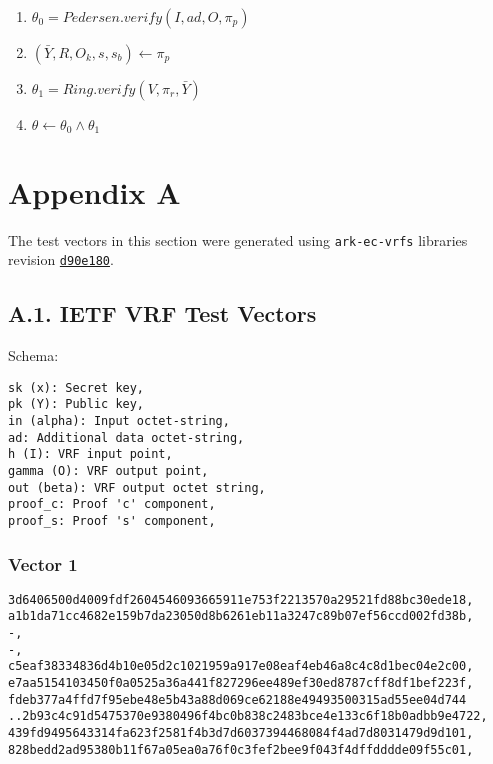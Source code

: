 \documentclass[
]{article}
\providecommand{\tightlist}{%
  \setlength{\itemsep}{0pt}\setlength{\parskip}{0pt}}
\begin{document}
\begin{enumerate}
\def\labelenumi{\arabic{enumi}.}
\tightlist
\item
  \(\theta_0 = Pedersen.verify(I, ad, O, \pi_p)\)
\item
  \((\bar{Y}, R, O_k, s, s_b) \gets \pi_p\)
\item
  \(\theta_1 = Ring.verify(V, \pi_r, \bar{Y})\)
\item
  \(\theta \gets \theta_0 \land \theta_1\)
\end{enumerate}

\hypertarget{appendix-a}{%
\section{Appendix A}\label{appendix-a}}

The test vectors in this section were generated using
\texttt{ark-ec-vrfs} libraries revision
\href{https://github.com/davxy/ark-ec-vrfs/tree/d90e1800d571f32163e6f7b5d956d065668c899f}{\texttt{d90e180}}.

\hypertarget{a.1.-ietf-vrf-test-vectors}{%
\subsection{A.1. IETF VRF Test
Vectors}\label{a.1.-ietf-vrf-test-vectors}}

Schema:

\begin{verbatim}
sk (x): Secret key,
pk (Y): Public key,
in (alpha): Input octet-string,
ad: Additional data octet-string,
h (I): VRF input point,
gamma (O): VRF output point,
out (beta): VRF output octet string,
proof_c: Proof 'c' component,
proof_s: Proof 's' component,
\end{verbatim}

\hypertarget{vector-1}{%
\subsubsection{Vector 1}\label{vector-1}}

\begin{verbatim}
3d6406500d4009fdf2604546093665911e753f2213570a29521fd88bc30ede18,
a1b1da71cc4682e159b7da23050d8b6261eb11a3247c89b07ef56ccd002fd38b,
-,
-,
c5eaf38334836d4b10e05d2c1021959a917e08eaf4eb46a8c4c8d1bec04e2c00,
e7aa5154103450f0a0525a36a441f827296ee489ef30ed8787cff8df1bef223f,
fdeb377a4ffd7f95ebe48e5b43a88d069ce62188e49493500315ad55ee04d744
..2b93c4c91d5475370e9380496f4bc0b838c2483bce4e133c6f18b0adbb9e4722,
439fd9495643314fa623f2581f4b3d7d6037394468084f4ad7d8031479d9d101,
828bedd2ad95380b11f67a05ea0a76f0c3fef2bee9f043f4dffdddde09f55c01,
\end{verbatim}
\end{document}
